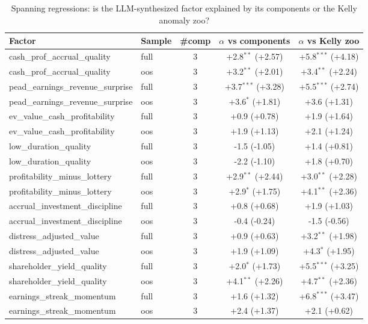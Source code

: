 \begin{table}[htbp]\centering
\caption{Spanning regressions: is the LLM-synthesized factor explained by its components or the Kelly anomaly zoo?}
\label{tab:spanning}
\begin{threeparttable}\footnotesize
\begin{tabular}{llccc}
\toprule
Factor & Sample & \#comp & $\alpha$ vs components & $\alpha$ vs Kelly zoo \\
\midrule
cash\_prof\_accrual\_quality & full & 3 & +2.8$^{**}$ (+2.57) & +5.8$^{***}$ (+4.18) \\
cash\_prof\_accrual\_quality & oos & 3 & +3.2$^{**}$ (+2.01) & +3.4$^{**}$ (+2.24) \\
pead\_earnings\_revenue\_surprise & full & 3 & +3.7$^{***}$ (+3.28) & +5.5$^{***}$ (+2.74) \\
pead\_earnings\_revenue\_surprise & oos & 3 & +3.6$^{*}$ (+1.81) & +3.6 (+1.31) \\
ev\_value\_cash\_profitability & full & 3 & +0.9 (+0.78) & +1.9 (+1.64) \\
ev\_value\_cash\_profitability & oos & 3 & +1.9 (+1.13) & +2.1 (+1.24) \\
low\_duration\_quality & full & 3 & -1.5 (-1.05) & +1.4 (+0.81) \\
low\_duration\_quality & oos & 3 & -2.2 (-1.10) & +1.8 (+0.70) \\
profitability\_minus\_lottery & full & 3 & +2.9$^{**}$ (+2.44) & +3.0$^{**}$ (+2.28) \\
profitability\_minus\_lottery & oos & 3 & +2.9$^{*}$ (+1.75) & +4.1$^{**}$ (+2.36) \\
accrual\_investment\_discipline & full & 3 & +0.8 (+0.68) & +1.9 (+1.03) \\
accrual\_investment\_discipline & oos & 3 & -0.4 (-0.24) & -1.5 (-0.56) \\
distress\_adjusted\_value & full & 3 & +0.9 (+0.63) & +3.2$^{**}$ (+1.98) \\
distress\_adjusted\_value & oos & 3 & +1.9 (+1.09) & +4.3$^{*}$ (+1.95) \\
shareholder\_yield\_quality & full & 3 & +2.0$^{*}$ (+1.73) & +5.5$^{***}$ (+3.25) \\
shareholder\_yield\_quality & oos & 3 & +4.1$^{**}$ (+2.26) & +4.7$^{**}$ (+2.36) \\
earnings\_streak\_momentum & full & 3 & +1.6 (+1.32) & +6.8$^{***}$ (+3.47) \\
earnings\_streak\_momentum & oos & 3 & +2.4 (+1.37) & +2.1 (+0.62) \\

\end{tabular}
\end{threeparttable}
\end{table}
